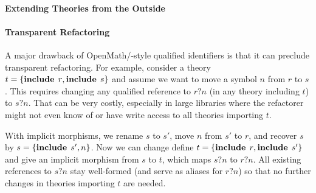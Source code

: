 \paragraph{Extending Theories from the Outside}

\paragraph{Transparent Refactoring}
A major drawback of OpenMath/\mmt-style qualified identifiers is that it can preclude transparent refactoring.
For example, consider a theory $t=\{\operatorname{\mathbf{include}}{\;r},\operatorname{\mathbf{include}}{\;s}\}$ and assume we want to move a symbol $n$ from $r$ to $s$.
This requires changing any qualified reference to $r?n$ (in any theory including $t$) to $s?n$.
That can be very costly, especially in large libraries where the refactorer might not even know of or have write access to all theories importing $t$.

With implicit morphisms, we rename $s$ to $s'$, move $n$ from $s'$ to $r$, and recover $s$ by $s=\{\operatorname{\mathbf{include}}{\;s'},n\}$.
Now we can change define $t=\{\operatorname{\mathbf{include}}{\;r},\operatorname{\mathbf{include}}{\;s'}\}$ and give an implicit morphism from $s$ to $t$, which maps $s?n$ to $r?n$.
All existing references to $s?n$ stay well-formed (and serve as aliases for $r?n$) so that no further changes in theories importing $t$ are needed.
